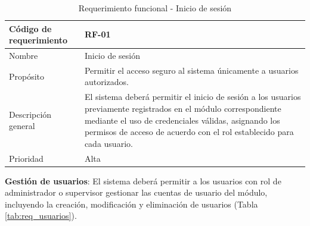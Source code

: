 \begin{table}[H]
    \centering
    \caption{Requerimiento funcional - Inicio de sesión}
    \label{tab:req_sesion}
    \begin{tabularx}{\textwidth}{|X|X|}
        \hline
        Código de requerimiento & RF-01                                                                                                                                                                                                                                             \\ \hline
        Nombre                  & Inicio de sesión                                                                                                                                                                                                                                  \\ \hline
        Propósito               & Permitir el acceso seguro al sistema únicamente a usuarios autorizados.                                                                                                                                                                           \\ \hline
        Descripción general     & El sistema deberá permitir el inicio de sesión a los usuarios previamente registrados en el módulo correspondiente mediante el uso de credenciales válidas, asignando los permisos de acceso de acuerdo con el rol establecido para cada usuario. \\ \hline
        Prioridad               & Alta                                                                                                                                                                                                                                              \\ \hline
    \end{tabularx}
\end{table}


\textbf{Gestión de usuarios}: El sistema deberá permitir a los usuarios con rol de administrador o supervisor gestionar las cuentas de usuario del módulo, incluyendo la creación, modificación y eliminación de usuarios (Tabla \ref{tab:req_usuarios}).

